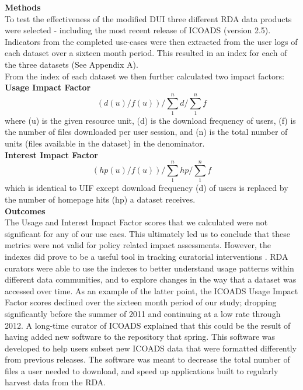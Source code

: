 \documentclass[thesis,tocnosub,noragright,centerchapter,12pt]{uiucecethesis09}
\begin{document}
\textbf{Methods}\\
To test the effectiveness of the modified DUI three
different RDA data products were selected - including the most recent
release of ICOADS (version 2.5). Indicators from the completed use-cases
were then extracted from the user logs of each dataset over a sixteen
month period. This resulted in an index for each of the three datasets
(See Appendix A).\\

From the index of each dataset we then further calculated two impact
factors:\\

  \textbf{Usage Impact Factor}
  \begin{equation}
  (d(u) / f(u))/\sum_{1}^{n}{d}/\sum_{1}^{n}{f}
  \end{equation}
  where (u) is the given resource unit, (d)
  is the download frequency of users, (f) is the number of files
  downloaded per user session, and (n) is the total number of units (files
  available in the dataset) in the denominator.\\
  
  \textbf{Interest Impact Factor}\begin{equation}
  (hp(u) / f(u))/\sum_{1}^{n}{hp}/\sum_{1}^{n}{f}
  \end{equation} which is identical to UIF except
  download frequency (d) of users is replaced by the number of homepage
  hits (hp) a dataset receives.\\

\textbf{Outcomes}\\

The Usage and Interest Impact Factor scores that we calculated were not significant for any of our use caes.  This ultimately led us to conclude
that these metrics were not valid for policy related impact assessments.
However, the indexes did prove to be a useful tool in tracking
curatorial interventions \citep{weber2013product}. RDA curators were able to
use the indexes to better understand usage patterns within different
data communities, and to explore changes in the way that a dataset was
accessed over time. As an example of the latter point, the ICOADS Usage
Impact Factor scores declined over the sixteen month period of our study; dropping
significantly before the summer of 2011 and continuing at a low rate
through 2012. A long-time curator of ICOADS explained that this could be
the result of having added new software to the repository that spring.
This software was developed to help users subset new ICOADS data that
were formatted differently from previous releases. The software was
meant to decrease the total number of files a user needed to download,
and speed up applications built to regularly harvest data from the RDA.\\
\end{document}
